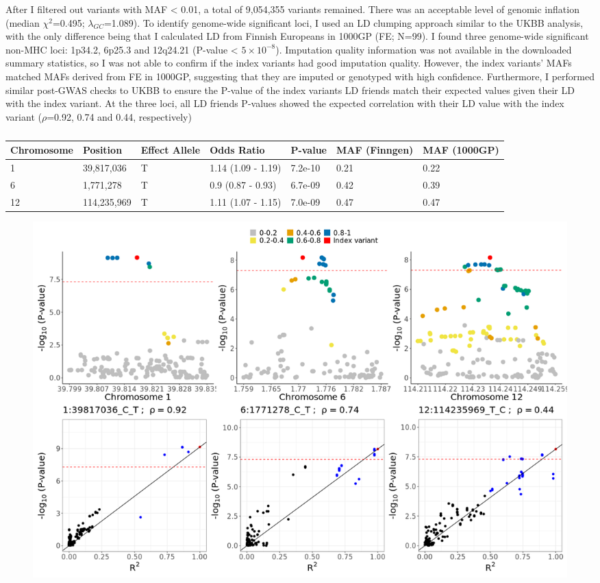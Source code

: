 After I filtered out variants with MAF < 0.01, a total of 9,054,355 variants remained. There was an acceptable level of genomic inflation (median $\chi^{2}$=0.495; $\lambda_{GC}$=1.089). To identify genome-wide significant loci, I used an LD clumping approach similar to the UKBB analysis, with the only difference being that I calculated LD from Finnish Europeans in 1000GP (FE; N=99). I found three genome-wide significant non-MHC loci: 1p34.2, 6p25.3 and 12q24.21 (P-value < $5\times10^{-8}$). Imputation quality information was not available in the downloaded summary statistics, so I was not able to confirm if the index variants had good imputation quality. However, the index variants' MAFs matched MAFs derived from FE in 1000GP, suggesting that they are imputed or genotyped with high confidence. Furthermore, I performed similar post-GWAS checks to UKBB to ensure the P-value of the index variants LD friends match their expected values given their LD with the index variant. At the three loci, all LD friends P-values showed the expected correlation with their LD value with the index variant ($\rho$=0.92, 0.74 and 0.44, respectively)

\begin{table}[htb]
  \centering\begingroup\fontsize{10}{12}\selectfont
  \caption{}
  \label{table:gws_finngen}
  \begin{tabular}[t]{|l|l|l|l|l|l|l|}
  \hline
  Chromosome & Position & Effect Allele & Odds Ratio & P-value & MAF (Finngen) & MAF (1000GP)\\
  \hline
  1 & 39,817,036 & T & 1.14 (1.09 - 1.19) & 7.2e-10 & 0.21 & 0.22\\
  \hline
  6 & 1,771,278 & T & 0.9 (0.87 - 0.93) & 6.7e-09 & 0.42 & 0.39\\
  \hline
  12 & 114,235,969 & T & 1.11 (1.07 - 1.15) & 7.0e-09 & 0.47 & 0.47\\
  \hline
  \end{tabular}
  \endgroup{}
  \end{table}

\begin{figure}[H] 
  \centering    
  \includegraphics[width=1.0\textwidth]{Vector/finngen_regional_assoc_ld_decay_plots.png}
  \caption[Figure]{}
  \label{fig:finngen_regional_assoc_ld_decay_plots}
  \end{figure}




